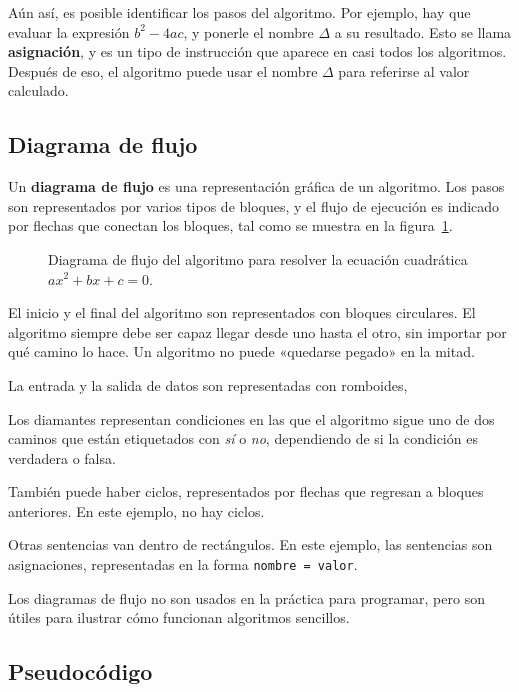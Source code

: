 Aún así, es posible identificar los pasos del algoritmo. Por ejemplo,
hay que evaluar la expresión \(b^2 - 4ac\), y ponerle el nombre \(\Delta\) a
su resultado. Esto se llama \textbf{asignación}, y es un tipo de
instrucción que aparece en casi todos los algoritmos. Después de eso, el
algoritmo puede usar el nombre \(\Delta\) para referirse al valor calculado.

\subsection{Diagrama de flujo}

Un \textbf{diagrama de flujo} es una representación gráfica de un
algoritmo. Los pasos son representados por varios tipos de bloques, y el
flujo de ejecución es indicado por flechas que conectan los bloques,
tal como se muestra en la figura~\ref{fig:diagrama-flujo-cuadratica}.

\begin{figure}
  \centering
  
  \caption{Diagrama de flujo del algoritmo para resolver
    la ecuación cuadrática \(ax^2 + bx + c = 0\).}
  \label{fig:diagrama-flujo-cuadratica}
\end{figure}

El inicio y el final del algoritmo son representados con bloques
circulares. El algoritmo siempre debe ser capaz llegar desde uno hasta
el otro, sin importar por qué camino lo hace. Un algoritmo no puede
«quedarse pegado» en la mitad.

La entrada y la salida de datos son representadas con romboides,

Los diamantes representan condiciones en las que el algoritmo sigue uno
de dos caminos que están etiquetados con \emph{sí} o \emph{no},
dependiendo de si la condición es verdadera o falsa.

También puede haber ciclos, representados por flechas que regresan a
bloques anteriores. En este ejemplo, no hay ciclos.

Otras sentencias van dentro de rectángulos.
En este ejemplo, las sentencias son asignaciones,
representadas en la forma \lstinline!nombre = valor!.

Los diagramas de flujo no son usados en la práctica para programar, pero
son útiles para ilustrar cómo funcionan algoritmos sencillos.

\subsection{Pseudocódigo}

